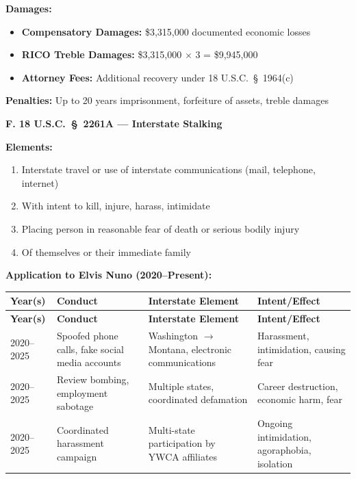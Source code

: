 \documentclass[11pt, letterpaper]{article}
\newcommand{\subsectiontitle}[1]{\vspace{0.15in}\noindent\textcolor{NavyBlue}{\textbf{#1}}\vspace{0.05in}}
\begin{document}
\textbf{Damages:}
\begin{itemize}[leftmargin=*,itemsep=2pt]
    \item \textbf{Compensatory Damages:} \$3,315,000 documented economic losses
    \item \textbf{RICO Treble Damages:} \$3,315,000 $\times$ 3 = \$9,945,000
    \item \textbf{Attorney Fees:} Additional recovery under 18 U.S.C.\ \S\ 1964(c)
\end{itemize}

\textbf{Penalties:} Up to 20 years imprisonment, forfeiture of assets, treble damages

\subsectiontitle{F. 18 U.S.C.\ \S\ 2261A --- Interstate Stalking}

\textbf{Elements:}
\begin{enumerate}[leftmargin=*,itemsep=2pt]
    \item Interstate travel or use of interstate communications (mail, telephone, internet)
    \item With intent to kill, injure, harass, intimidate
    \item Placing person in reasonable fear of death or serious bodily injury
    \item Of themselves or their immediate family
\end{enumerate}

\textbf{Application to Elvis Nuno (2020--Present):}

\begin{center}
\begin{longtable}{|p{0.8in}|p{1.6in}|p{1.3in}|p{1.5in}|}
\hline
\textbf{Year(s)} & \textbf{Conduct} & \textbf{Interstate Element} & \textbf{Intent/Effect} \\
\hline
\endfirsthead
\hline
\textbf{Year(s)} & \textbf{Conduct} & \textbf{Interstate Element} & \textbf{Intent/Effect} \\
\hline
\endhead
2020--2025 & Spoofed phone calls, fake social media accounts & Washington $\rightarrow$ Montana, electronic communications & Harassment, intimidation, causing fear \\
\hline
2020--2025 & Review bombing, employment sabotage & Multiple states, coordinated defamation & Career destruction, economic harm, fear \\
\hline
2020--2025 & Coordinated harassment campaign & Multi-state participation by YWCA affiliates & Ongoing intimidation, agoraphobia, isolation \\
\hline
\end{longtable}
\end{center}
\end{document}
